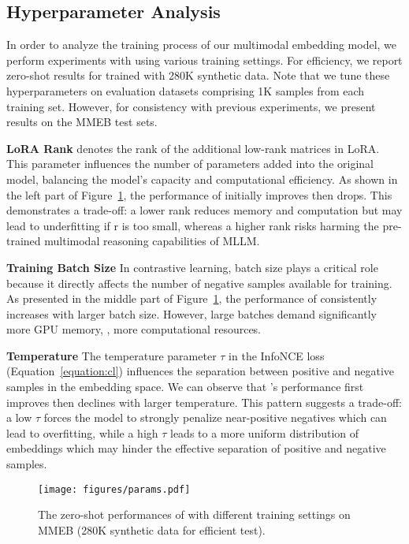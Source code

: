 \subsection{Hyperparameter Analysis}

In order to analyze the training process of our multimodal embedding model, we perform experiments with \ours{} using various training settings.
For efficiency, we report zero-shot results for \ours{} trained with 280K synthetic data.
Note that we tune these hyperparameters on evaluation datasets comprising 1K samples from each training set.
However, for consistency with previous experiments, we present results on the MMEB test sets.


\noindent \textbf{LoRA Rank}
denotes the rank of the additional low-rank matrices in LoRA. 
This parameter influences the number of parameters added into the original model, balancing the model's capacity and computational efficiency.
As shown in the left part of Figure~\ref{fig:param}, the performance of \ours{} initially improves then drops.
This demonstrates a trade-off: a lower rank reduces memory and computation but may lead to underfitting if r is too small, whereas a higher rank risks harming the pre-trained multimodal reasoning capabilities of MLLM.



\noindent \textbf{Training Batch Size}
In contrastive learning, batch size plays a critical role because it directly affects the number of negative samples available for training.
As presented in the middle part of Figure~\ref{fig:param}, the performance of \ours{} consistently increases with larger batch size.
However, large batches demand significantly more GPU memory, \ie, more computational resources.


\noindent \textbf{Temperature }
The temperature parameter $\tau$ in the InfoNCE loss (Equation~\ref{equation:cl}) influences the separation between positive and negative samples in the embedding space.
We can observe that \ours{}'s performance first improves then declines with larger temperature.
This pattern suggests a trade-off:
a low $\tau$ forces the model to strongly penalize near-positive negatives which can lead to overfitting, while a high $\tau$ leads to a more uniform distribution of embeddings which may hinder the effective separation of positive and negative samples.



\begin{figure}[t]
\centering
\texttt{[image: figures/params.pdf]}
\vspace{-2pt}
\caption{The zero-shot performances of \ours{} with different training settings on MMEB (280K synthetic data for efficient test).}
\label{fig:param} 
\end{figure}


